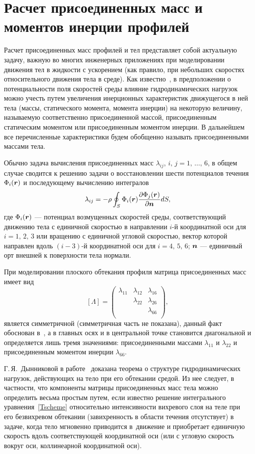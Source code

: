 \documentclass[12pt, a4paper]{article}
\renewcommand{\vec}[1]{\text{\mathversion{bold}${#1}$}}%
\begin{document}
\section{Расчет присоединенных масс и моментов инерции профилей}

Расчет присоединенных масс профилей и тел представляет собой актуальную задачу, важную во многих инженерных приложениях при моделировании движения тел в жидкости с ускорением (как правило, при небольших скоростях относительного движения тела в среде). Как известно~\cite{Sedov}, в предположении о потенциальности поля скоростей среды влияние гидродинамических нагрузок можно учесть путем увеличения инерционных характеристик движущегося в ней тела (массы, статического момента, момента инерции) на некоторую величину, называемую соответственно присоединенной массой, присоединенным статическим моментом или присоединенным моментом инерции. В дальнейшем все перечисленные характеристики будем обобщенно называть присоединенными массами тела.

Обычно задача вычисления присоединенных масс $\lambda_{ij}$, $i,\,j=1,\,\ldots,\,6$, в общем случае сводится к решению задачи о восстановлении шести потенциалов течения $\Phi_i(\vec r)$ и последующему вычислению интегралов
\[
\lambda_{ij} = -\rho \oint_S \Phi_i(\vec r) \frac{\partial \Phi_j(\vec r)}{\partial \vec n} dS,
\]
где $\Phi_i(\vec r)$ --- потенциал возмущенных скоростей среды, соответствующий движению тела с единичной скоростью в направлении $i$-й координатной оси для $i=1,\,2,\,3$ или вращению с единичной угловой скоростью, вектор которой направлен вдоль $(i-3)$-й координатной оси для $i=4,\,5,\,6$; $\vec n$ --- единичный орт внешней к поверхности тела нормали.

При моделировании плоского обтекания профиля матрица присоединенных масс имеет вид
\[
[\Lambda]=
\begin{pmatrix}
\lambda_{11} & \lambda_{12} & \lambda_{16} \\
& \lambda_{22} & \lambda_{26} \\
&              & \lambda_{66} \\
\end{pmatrix},
\]
является симметричной (симметричная часть не показана), данный факт обоснован в~\cite{Sedov}, а в главных осях и в центральной точке становится диагональной и определяется лишь тремя значениями: присоединенными массами $\lambda_{11}$ и $\lambda_{22}$ и присоединенным моментом инерции $\lambda_{66}$.
\medskip

Г.\,Я.~Дынниковой в работе~\cite{Dyn2019} доказана теорема о структуре гидродинамических нагрузок, действующих на тело при его обтекании средой. Из нее следует, в частности, что компоненты матрицы присоединенных масс тела можно определить весьма простым путем, если известно решение интегрального уравнения~\eqref{Tscheme} относительно интенсивности вихревого слоя на теле при его безвихревом обтекании (завихренность в области течения отсутствует) в задаче, когда тело мгновенно приводится в~движение и приобретает единичную скорость вдоль соответствующей координатной оси (или с угловую скорость вокруг оси, коллинеарной координатной оси).
\end{document}
